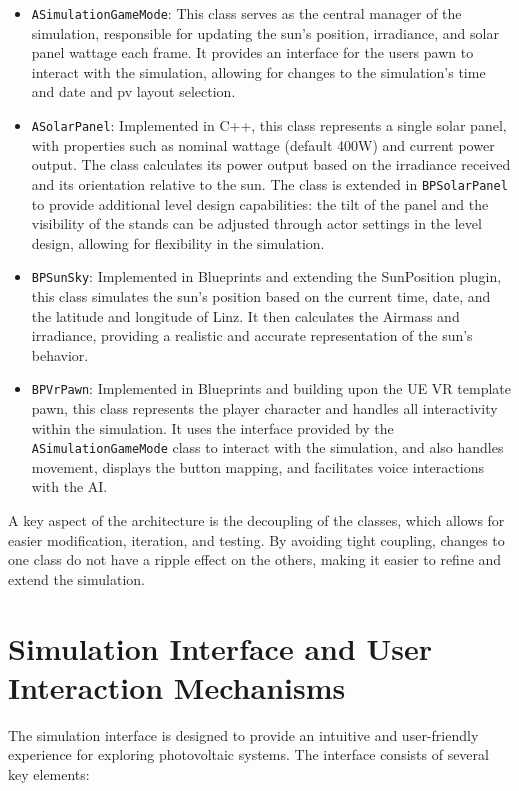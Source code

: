 \documentclass[draft, final]{vutinfth} %
\begin{document}
\begin{itemize}
    \item \lstinline|ASimulationGameMode|: This class serves as the central manager of the simulation, responsible for updating the sun's position, irradiance, and solar panel wattage each frame. It provides an interface for the users pawn to interact with the simulation, allowing for changes to the simulation's time and date and pv layout selection.
    \item \lstinline|ASolarPanel|: Implemented in C++, this class represents a single solar panel, with properties such as nominal wattage (default 400W) and current power output. The class calculates its power output based on the irradiance received and its orientation relative to the sun. The class is extended in \lstinline|BPSolarPanel| to provide additional level design capabilities: the tilt of the panel and the visibility of the stands can be adjusted through actor settings in the level design, allowing for flexibility in the simulation.
    \item \lstinline|BPSunSky|: Implemented in Blueprints and extending the SunPosition plugin, this class simulates the sun's position based on the current time, date, and the latitude and longitude of Linz. It then calculates the Airmass and irradiance, providing a realistic and accurate representation of the sun's behavior.
    \item \lstinline|BPVrPawn|: Implemented in Blueprints and building upon the UE VR template pawn, this class represents the player character and handles all interactivity within the simulation. It uses the interface provided by the \lstinline|ASimulationGameMode| class to interact with the simulation, and also handles movement, displays the button mapping, and facilitates voice interactions with the AI.
\end{itemize}

A key aspect of the architecture is the decoupling of the classes, which allows for easier modification, iteration, and testing. By avoiding tight coupling, changes to one class do not have a ripple effect on the others, making it easier to refine and extend the simulation.

\section{Simulation Interface and User Interaction Mechanisms}

The simulation interface is designed to provide an intuitive and user-friendly experience for exploring photovoltaic systems. The interface consists of several key elements:
\end{document}
